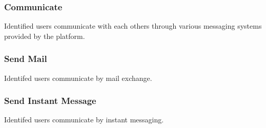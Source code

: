 	\subsubsection{Communicate}
		Identified users communicate with each others through various messaging systems provided by the platform.
	\subsubsection{Send Mail}
		Identifed users communicate by mail exchange.
	\subsubsection{Send Instant Message}
		Identifed users communicate by instant messaging.
